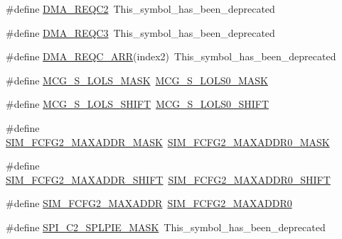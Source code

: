 \begin{DoxyCompactItemize}
\item 
\#define \hyperlink{group___backward___compatibility___symbols_ga49eb3e3e2e8e2323ffcc73e88075672f}{D\+M\+A\+\_\+\+R\+E\+Q\+C2}~This\+\_\+symbol\+\_\+has\+\_\+been\+\_\+deprecated
\item 
\#define \hyperlink{group___backward___compatibility___symbols_ga9fe628acf4e42637941f92c2886494b8}{D\+M\+A\+\_\+\+R\+E\+Q\+C3}~This\+\_\+symbol\+\_\+has\+\_\+been\+\_\+deprecated
\item 
\#define \hyperlink{group___backward___compatibility___symbols_gaa78b620eb41bc2962c477844e4039b67}{D\+M\+A\+\_\+\+R\+E\+Q\+C\+\_\+\+A\+RR}(index2)~This\+\_\+symbol\+\_\+has\+\_\+been\+\_\+deprecated
\item 
\#define \hyperlink{group___backward___compatibility___symbols_ga247a34b938aaa44d22f5cd4f56d95987}{M\+C\+G\+\_\+\+S\+\_\+\+L\+O\+L\+S\+\_\+\+M\+A\+SK}~\hyperlink{group___m_c_g___register___masks_gae5967720d747b4d6f9fa748c94570c6d}{M\+C\+G\+\_\+\+S\+\_\+\+L\+O\+L\+S0\+\_\+\+M\+A\+SK}
\item 
\#define \hyperlink{group___backward___compatibility___symbols_gae1d3f34b04899a885dcbd465e5154191}{M\+C\+G\+\_\+\+S\+\_\+\+L\+O\+L\+S\+\_\+\+S\+H\+I\+FT}~\hyperlink{group___m_c_g___register___masks_ga5cddd795823b73d50830e628cee24644}{M\+C\+G\+\_\+\+S\+\_\+\+L\+O\+L\+S0\+\_\+\+S\+H\+I\+FT}
\item 
\#define \hyperlink{group___backward___compatibility___symbols_ga1a81d18d9f76e9b66fe0959cf2a1f917}{S\+I\+M\+\_\+\+F\+C\+F\+G2\+\_\+\+M\+A\+X\+A\+D\+D\+R\+\_\+\+M\+A\+SK}~\hyperlink{group___s_i_m___register___masks_gad1096c0a75d0bf4dfc93f4b1957fe493}{S\+I\+M\+\_\+\+F\+C\+F\+G2\+\_\+\+M\+A\+X\+A\+D\+D\+R0\+\_\+\+M\+A\+SK}
\item 
\#define \hyperlink{group___backward___compatibility___symbols_gae8fbe7e05f4c39ee13322ab15d75d089}{S\+I\+M\+\_\+\+F\+C\+F\+G2\+\_\+\+M\+A\+X\+A\+D\+D\+R\+\_\+\+S\+H\+I\+FT}~\hyperlink{group___s_i_m___register___masks_ga3ccb8fde0ef2e170d0c84cdfa3651d34}{S\+I\+M\+\_\+\+F\+C\+F\+G2\+\_\+\+M\+A\+X\+A\+D\+D\+R0\+\_\+\+S\+H\+I\+FT}
\item 
\#define \hyperlink{group___backward___compatibility___symbols_gadcad6c136698a35d9732d3d849808a19}{S\+I\+M\+\_\+\+F\+C\+F\+G2\+\_\+\+M\+A\+X\+A\+D\+DR}~\hyperlink{group___s_i_m___register___masks_gae7829e3338a5d460d360b8ed9e06e1e1}{S\+I\+M\+\_\+\+F\+C\+F\+G2\+\_\+\+M\+A\+X\+A\+D\+D\+R0}
\item 
\#define \hyperlink{group___backward___compatibility___symbols_gadcaa58bac25c102454d3f54da041122f}{S\+P\+I\+\_\+\+C2\+\_\+\+S\+P\+L\+P\+I\+E\+\_\+\+M\+A\+SK}~This\+\_\+symbol\+\_\+has\+\_\+been\+\_\+deprecated

\end{DoxyCompactItemize}

